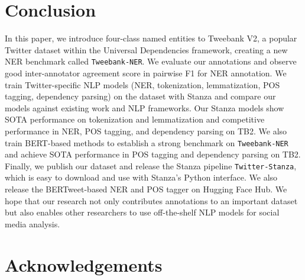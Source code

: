 \documentclass[10pt, a4paper]{article}
\begin{document}
\section{Conclusion}

In this paper, we introduce four-class named entities to Tweebank V2, a popular Twitter dataset within the Universal Dependencies framework, creating a new NER benchmark called \texttt{Tweebank-NER}. We evaluate our annotations and observe good inter-annotator agreement score in pairwise F1 for NER annotation. We train Twitter-specific NLP models (NER, tokenization, lemmatization, POS tagging, dependency parsing) on the dataset with Stanza and compare our models against existing work and NLP frameworks. Our Stanza models show SOTA performance on tokenization and lemmatization and competitive performance in NER, POS tagging, and dependency parsing on TB2. We also train BERT-based methods to establish a strong benchmark on \texttt{Tweebank-NER} and achieve SOTA performance in POS tagging and dependency parsing on TB2. Finally, we publish our dataset and release the Stanza pipeline \verb|Twitter-Stanza|, which is easy to download and use with Stanza's Python interface. We also release the BERTweet-based NER and POS tagger on Hugging Face Hub. We hope that our research not only contributes annotations to an important dataset but also enables other researchers to use off-the-shelf NLP models for social media analysis. 

\section{Acknowledgements}
\end{document}

